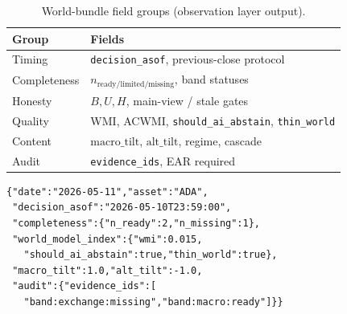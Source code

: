 \documentclass[sigconf,anonymous]{acmart}
\theoremstyle{acmdefinition}%
\theoremstyle{acmplain}%
\begin{document}
\begin{table}[t]
  \caption{World-bundle field groups (observation layer output).}
  \label{tab:schema}
  \small
  \begin{tabular}{ll}
    \toprule
    Group & Fields \\
    \midrule
    Timing & \texttt{decision\_asof}, previous-close protocol \\
    Completeness & \(n_{\mathrm{ready/limited/missing}}\), band statuses \\
    Honesty & \(B,U,H\), main-view / stale gates \\
    Quality & WMI, ACWMI, \texttt{should\_ai\_abstain}, \texttt{thin\_world} \\
    Content & \(\mathrm{macro\_tilt}\), \(\mathrm{alt\_tilt}\), regime, cascade \\
    Audit & \texttt{evidence\_ids}, EAR required \\
    \bottomrule
  \end{tabular}
\end{table}

\begin{lstlisting}[caption={Compact Compiled bundle example (OOS exchange gap).},label={lst:bundle}]
{"date":"2026-05-11","asset":"ADA",
 "decision_asof":"2026-05-10T23:59:00",
 "completeness":{"n_ready":2,"n_missing":1},
 "world_model_index":{"wmi":0.015,
   "should_ai_abstain":true,"thin_world":true},
 "macro_tilt":1.0,"alt_tilt":-1.0,
 "audit":{"evidence_ids":[
   "band:exchange:missing","band:macro:ready"]}}
\end{lstlisting}
\end{document}
